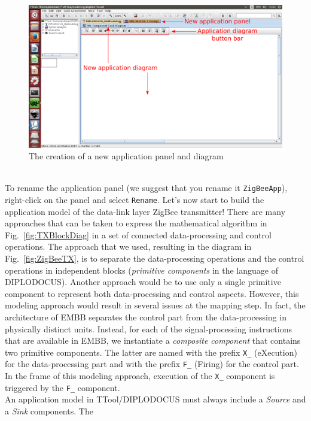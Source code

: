\documentclass{llncs}
\newcommand{\screenshotsize}{1.0\textwidth}
\begin{document}
\begin{figure}[!htbp]
	\centering
	\includegraphics[width=\screenshotsize]{figures/screenshot/AppPanel.pdf}
	\caption{The creation of a new application panel and diagram}
	\label{fig:AppPanel}
\end{figure}
%
\\To rename the application panel (we suggest that you rename it \texttt{ZigBeeApp}), right-click on the panel and select
\texttt{Rename}. Let's now start to build the application model of the data-link layer ZigBee transmitter! There are
many approaches that can be taken to express the mathematical algorithm in Fig.~\ref{fig:TXBlockDiag} in a set of
connected data-processing and control operations. The approach that we used, resulting in the diagram in
Fig.~\ref{fig:ZigBeeTX}, is to separate the data-processing operations and the control operations in independent blocks
(\textit{primitive components} in the language of DIPLODOCUS). Another approach would be to use only a single primitive
component to represent both data-processing and control aspects. However, this modeling approach would result in several
issues at the mapping step. In fact, the architecture of EMBB separates the control part from the data-processing in
physically distinct units. Instead, for each of the signal-processing instructions that are available in EMBB, we
instantiate a \textit{composite component} that contains two primitive components. The latter are named with the prefix
\texttt{X\_} (eXecution) for the data-processing part and with the prefix \texttt{F\_} (Firing) for the control part.
In the frame of this modeling approach, execution of the \texttt{X\_} component is triggered by the \texttt{F\_}
component.\\
%
An application model in TTool/DIPLODOCUS must always include a \textit{Source} and a \textit{Sink} components. The
\end{document}
